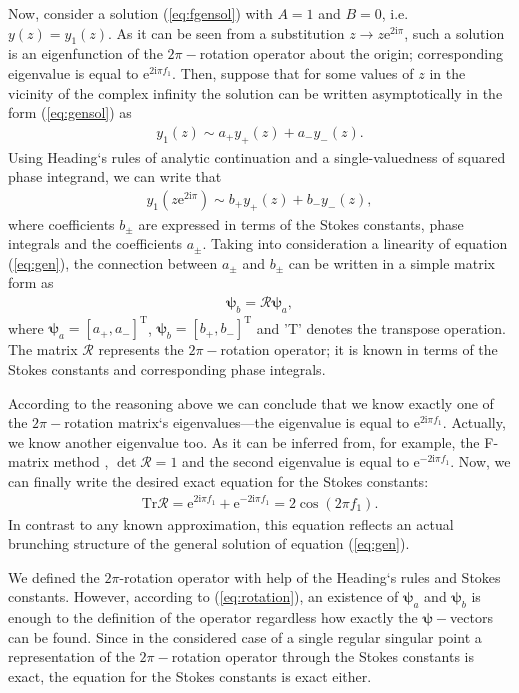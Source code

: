\documentclass[asy]{iosart2x}
\def\rmi{\mathrm{i}}
\def\rme{\mathrm{e}}
\def\psii{\bm{\psi}}
\def\R{\bm{\mathcal{R}}}
\def\T{\mathrm{T}}
\def\Tr{\mathrm{Tr}}
\newcommand\eref[1]{(\ref{#1})}
\begin{document}
Now, consider a solution \eref{eq:fgensol} with $A=1$ and $B=0$, i.e. $y(z)=y_1(z)$. 
As it can be seen from a substitution \mbox{$z \rightarrow z \rme^{2 \rmi \pi}$}, 
such a solution is an eigenfunction of the $2\pi-$rotation operator about the origin; 
corresponding eigenvalue is equal to $\rme^{2 \rmi \pi f_1}$.  
Then, suppose that for some values of $z$ in the vicinity of the complex infinity 
the solution can be written asymptotically in the form \eref{eq:gensol} as
\begin{eqnarray}
y_1(z) \sim a_+y_+(z) + a_-y_-(z).
\end{eqnarray}
Using Heading`s rules of analytic continuation \cite{heading,rwbook} and a single-valuedness 
of squared phase integrand, we can write that
\begin{eqnarray}
y_1(z \rme^{2 \rmi \pi}) \sim b_+y_+(z) + b_-y_-(z),
\end{eqnarray}
where coefficients $b_{\pm}$ are expressed in terms of the Stokes constants, phase integrals and 
the coefficients $a_{\pm}$. Taking into consideration a linearity of equation \eref{eq:gen}, 
the connection between $a_{\pm}$ and $b_{\pm}$ can be written in a simple matrix form as
\begin{eqnarray}
\psii_b = \R \psii_a,
\label{eq:rotation}
\end{eqnarray}
where $\psii_a = [{a_+,a_-}]^{\T}$, $\psii_b = [{b_+,b_-}]^{\T}$ and 'T' denotes the transpose operation.
The matrix $\R$ represents the $2\pi-$rotation operator; it is known in terms of
the Stokes constants and corresponding phase integrals. 

According to the reasoning above we can conclude
that we know exactly one of the $2\pi-$rotation matrix`s eigenvalues---the eigenvalue is 
equal to $\rme^{2 \rmi \pi f_1}$. Actually, we know another eigenvalue too. 
As it can be inferred from, for example, the F-matrix method \cite{frbook}, $\det\R=1$ and the second eigenvalue is equal 
to $\rme^{-2 \rmi \pi f_1}$. Now, we can finally write the desired exact equation for the Stokes constants:
\begin{eqnarray}
\Tr\R = \rme^{2 \rmi \pi f_1} + \rme^{-2 \rmi \pi f_1} = 2 \cos(2 \pi f_1).
\label{eq:main}
\end{eqnarray}
In contrast to any known approximation, this equation reflects an actual brunching structure 
of the general solution of equation \eref{eq:gen}. 

We defined the $2\pi$-rotation operator with help of the Heading`s rules and Stokes constants. However, 
according to \eref{eq:rotation}, an existence of $\psii_a$ and $\psii_b$ is enough to the definition of
the operator regardless how exactly the $\psii-$vectors can be found. Since in the considered case of a 
single regular singular point a representation of the $2\pi-$rotation operator through the Stokes constants 
is exact, the equation for the Stokes constants is exact either. 
\end{document}
